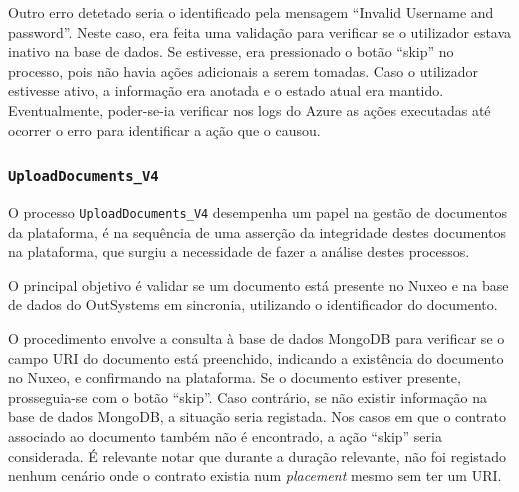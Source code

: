             Outro erro detetado seria o identificado pela mensagem ``Invalid Username and password''. Neste caso, era feita uma validação para verificar se o utilizador estava inativo na base de dados. Se estivesse, era pressionado o botão ``skip'' no processo, pois não havia ações adicionais a serem tomadas. Caso o utilizador estivesse ativo, a informação era anotada e o estado atual era mantido. Eventualmente, poder-se-ia verificar nos logs do Azure as ações executadas até ocorrer o erro para identificar a ação que o causou.


        
        \subsubsection{\texttt{UploadDocuments\_V4}}\label{secsec:uploaddocuments_v4}

            O processo \texttt{UploadDocuments\_V4} desempenha um papel na gestão de documentos da plataforma, é na sequência de uma asserção da integridade destes documentos na plataforma, que surgiu a necessidade de fazer a análise destes processos. 
            
            O principal objetivo é validar se um documento está presente no Nuxeo e na base de dados do OutSystems em sincronia, utilizando o identificador do documento.

            O procedimento envolve a consulta à base de dados MongoDB para verificar se o campo URI do documento está preenchido, indicando a existência do documento no Nuxeo, e confirmando na plataforma. Se o documento estiver presente, prosseguia-se com o botão ``skip''. Caso contrário, se não existir informação na base de dados MongoDB, a situação seria registada. Nos casos em que o contrato associado ao documento também não é encontrado, a ação ``skip'' seria considerada. É relevante notar que durante a duração relevante, não foi registado nenhum cenário onde o contrato existia num \textit{placement} mesmo sem ter um URI.

